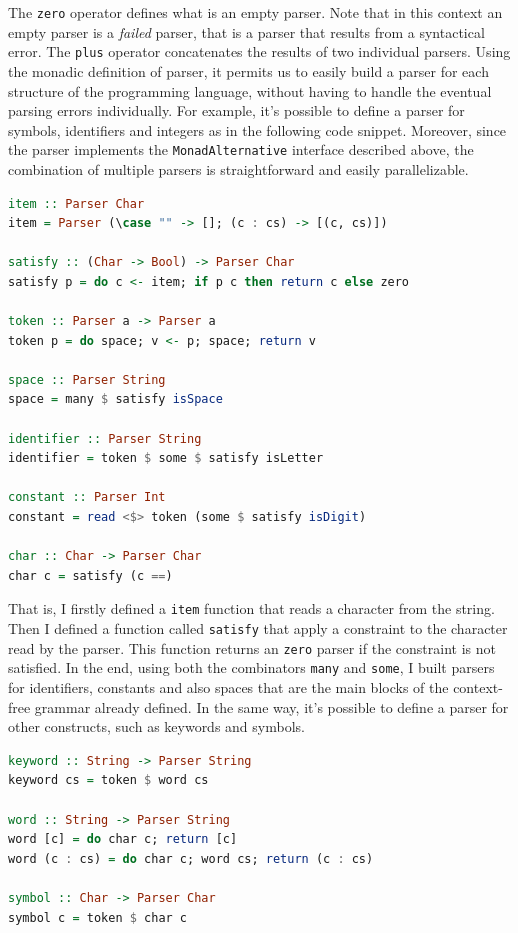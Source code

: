 \documentclass[12pt,a4paper]{article}
\begin{document}
The \texttt{zero} operator defines what is an empty parser.
Note that in this context an empty parser is a \textit{failed} parser, that is a parser that results from a syntactical error.
The \texttt{plus} operator concatenates the results of two individual parsers.
Using the monadic definition of parser, it permits us to easily build a parser for each structure of the programming language, without having to handle the eventual parsing errors individually.
For example, it's possible to define a parser for symbols, identifiers and integers as in the following code snippet.
Moreover, since the parser implements the \texttt{MonadAlternative} interface described above, the combination of multiple parsers is straightforward and easily parallelizable.
\begin{lstlisting}[language=Haskell, style=custom-style]
item :: Parser Char
item = Parser (\case "" -> []; (c : cs) -> [(c, cs)])

satisfy :: (Char -> Bool) -> Parser Char
satisfy p = do c <- item; if p c then return c else zero

token :: Parser a -> Parser a
token p = do space; v <- p; space; return v

space :: Parser String
space = many $ satisfy isSpace

identifier :: Parser String
identifier = token $ some $ satisfy isLetter

constant :: Parser Int
constant = read <$> token (some $ satisfy isDigit)

char :: Char -> Parser Char
char c = satisfy (c ==)
\end{lstlisting}
That is, I firstly defined a \texttt{item} function that reads a character from the string.
Then I defined a function called \texttt{satisfy} that apply a constraint to the character read by the parser.
This function returns an \texttt{zero} parser if the constraint is not satisfied.
In the end, using both the combinators \texttt{many} and \texttt{some}, I built parsers for identifiers, constants and also spaces that are the main blocks of the context-free grammar already defined.
In the same way, it's possible to define a parser for other constructs, such as keywords and symbols.
\begin{lstlisting}[language=Haskell, style=custom-style]
keyword :: String -> Parser String
keyword cs = token $ word cs

word :: String -> Parser String
word [c] = do char c; return [c]
word (c : cs) = do char c; word cs; return (c : cs)

symbol :: Char -> Parser Char
symbol c = token $ char c
\end{lstlisting}
\end{document}
